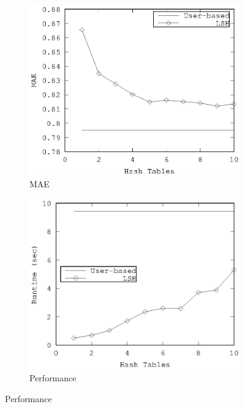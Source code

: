 \documentclass[conference]{IEEEtran}
\begin{document}
\begin{figure}[!h]
        \begin{subfigure}[b]{0.225\textwidth}
                \includegraphics[width=\textwidth]{charts/ub-mae-hash-tables.eps}
                \caption{MAE}
                \label{fig:ub-lsh-tables-mae}
        \end{subfigure}
        \quad
        \begin{subfigure}[b]{0.225\textwidth}
                \includegraphics[width=\textwidth]{charts/ub-runtime-hash-tables.eps}
                \caption{Performance}

\end{subfigure}
\end{figure}
\end{document}
